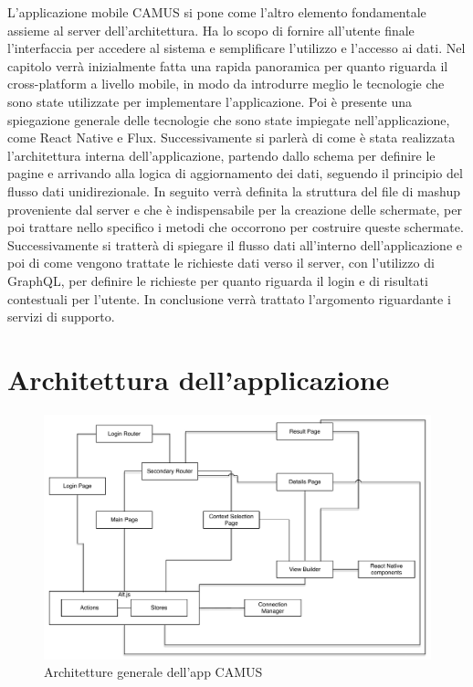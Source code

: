 L'applicazione mobile CAMUS si pone come l'altro elemento fondamentale assieme al server dell'architettura. Ha lo scopo di fornire all'utente finale l'interfaccia per accedere al sistema e semplificare l'utilizzo e l'accesso ai dati. Nel capitolo verrà inizialmente fatta una rapida panoramica per quanto riguarda il cross-platform a livello mobile, in modo da introdurre meglio le tecnologie che sono state utilizzate per implementare l'applicazione. Poi è presente una spiegazione generale delle tecnologie che sono state impiegate nell'applicazione, come React Native e Flux. Successivamente si parlerà di come è stata realizzata l'architettura interna dell'applicazione, partendo dallo schema per definire le pagine e arrivando alla logica di aggiornamento dei dati, seguendo il principio del flusso dati unidirezionale. In seguito verrà definita la struttura del file di mashup proveniente dal server e che è indispensabile per la creazione delle schermate, per poi trattare nello specifico i metodi che occorrono per costruire queste schermate.
Successivamente si tratterà di spiegare il flusso dati all'interno dell'applicazione e poi di come vengono trattate le richieste dati verso il server, con l'utilizzo di GraphQL, per definire le richieste per quanto riguarda il login e di risultati contestuali per l'utente. In conclusione verrà trattato l'argomento riguardante i servizi di supporto.

\section {Architettura dell'applicazione}\label{sec:architettura-applicazione}

\begin{figure}[ht]
	\centering
	\includegraphics[width=\textwidth]{6-implementazione-app/immagini/app_architecture.pdf}
	\caption{Architetture generale dell'app CAMUS}\label{fig:app-architecture}
\end{figure}

